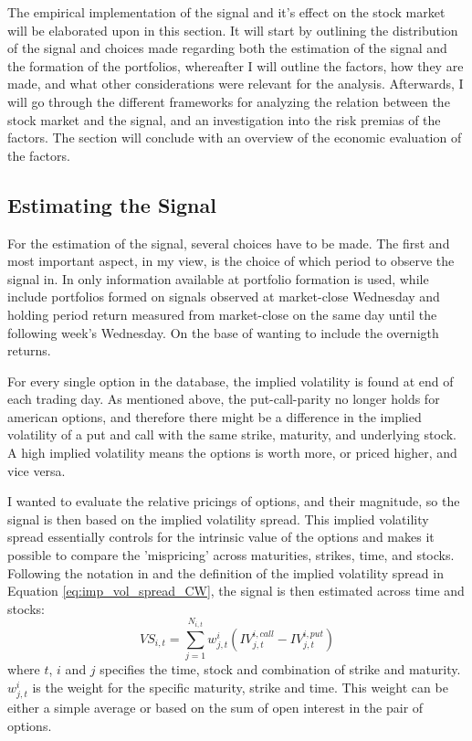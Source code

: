 
The empirical implementation of the signal and it's effect on the stock market will be elaborated upon in this section. It will start by outlining the distribution of the signal and choices made regarding both the estimation of the signal and the formation of the portfolios, whereafter I will outline the factors, how they are made, and what other considerations were relevant for the analysis. Afterwards, I will go through the different frameworks for analyzing the relation between the stock market and the signal, and an investigation into the risk premias of the factors. The section will conclude with an overview of the economic evaluation of the factors.

\subsection{Estimating the Signal}

For the estimation of the signal, several choices have to be made. The first and most important aspect, in my view, is the choice of which period to observe the signal in. In \cite{fama1992cross} only information available at portfolio formation is used, while \cite{cremers2010deviations} include portfolios formed on signals observed at market-close Wednesday and holding period return measured from market-close on the same day until the following week's Wednesday. On the base of wanting to include the overnigth returns. 

For every single option in the database, the implied volatility is found at end of each trading day. As mentioned above, the put-call-parity no longer holds for american options, and therefore there might be a difference in the implied volatility of a put and call with the same strike, maturity, and underlying stock. A high implied volatility means the options is worth more, or priced higher, and vice versa. 

I wanted to evaluate the relative pricings of options, and their magnitude, so the signal is then based on the implied volatility spread. This implied volatility spread essentially controls for the intrinsic value of the options and makes it possible to compare the 'mispricing' across maturities, strikes, time, and stocks. Following the notation in \cite{cremers2010deviations} and the definition of the implied volatility spread in Equation \ref{eq:imp_vol_spread_CW},  the signal is then estimated across time and stocks:
\begin{equation}
	VS_{i,t} = \sum_{j=1}^{N_{i,t}}w_{j,t}^{i}\left(IV_{j,t}^{i,call}-IV_{j,t}^{i,put}\right)
\end{equation}
where $t$, $i$ and $j$ specifies the time, stock and combination of strike and maturity. $w_{j,t}^{i}$ is the weight for the specific maturity, strike and time. This weight can be either a simple average or based on the sum of open interest in the pair of options.

